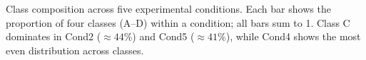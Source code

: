 \caption{Class composition across five experimental conditions. Each bar shows the proportion of four classes (A--D) within a condition; all bars sum to 1. Class C dominates in Cond2 ($\approx44\%$) and Cond5 ($\approx41\%$), while Cond4 shows the most even distribution across classes.}
